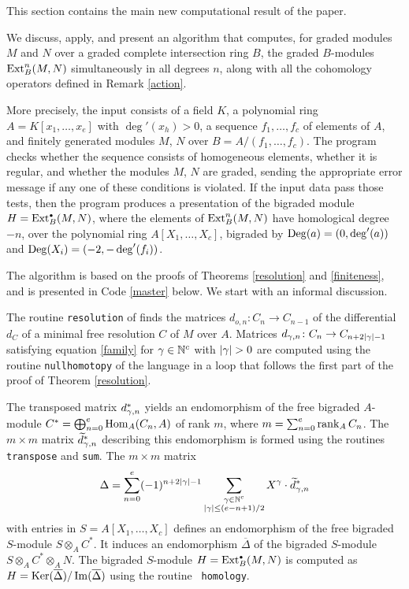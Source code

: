This section contains the main new computational result of the paper.

We discuss, apply, and present an algorithm that computes, for graded
modules $M$ and $N$ over a graded complete intersection ring $B$, the
graded $B$-modules $\operatorname{Ext}^n_B(M,N)$ simultaneously in all degrees $n$,
along with all the cohomology operators defined in Remark
\ref{action}.

More precisely, the input consists of a field $K$, a polynomial ring
$A=K[x_1,\dots,x_e]$ with $\deg'(x_h)>0$, a sequence $f_1,\dots,f_c$ of
elements of $A$, and finitely generated modules $M$, $N$ over
$B=A/(f_1,\dots,f_c)$.  The program checks whether the sequence
consists of homogeneous elements, whether it is regular, and whether
the modules $M$, $N$ are graded, sending the appropriate error message
if any one of these conditions is violated.  If the input data pass
those tests, then the program produces a presentation of the bigraded
module $H=\operatorname{Ext}^{\scriptscriptstyle\bullet}_B(M,N)$, where the elements of $\operatorname{Ext}^n_B(M,N)$ have
homological degree $-n$, over the polynomial ring $A[X_1,\dots,X_c]$,
bigraded by $\operatorname{Deg}(a)=(0,\deg'(a))$ and $\operatorname{Deg}(X_i)=(-2,-\deg'(f_i))$.

The algorithm is based on the proofs of Theorems \ref{resolution} and
\ref{finiteness}, and is presented in Code \ref{master} below.  We
start with an informal discussion.

\begin{Remark}
\label{algorithm}
The routine {\tt resolution} of \Mtwo finds the matrices $d_{o,n}\colon
C_n\to C_{n-1}$ of the differential $d_C$ of a minimal free resolution
$C$ of $M$ over $A$.  Matrices $d_{\gamma,n}\colon C_n\to C_{n+2|\gamma|-1}$
satisfying equation \eqref{family} for $\gamma\in{\mathbb N}^c$ with $|\g|>0$ are
computed using the routine {\tt nullhomotopy} of the \Mtwo language in
a loop that follows the first part of the proof of Theorem
\ref{resolution}.  

The transposed matrix $d^*_{\gamma,n}$ yields an endomorphism of the free
bigraded $A$-module $C^*=\bigoplus_{n=0}^e \operatorname{Hom}_A(C_n,A)$ of rank $m$,
where $m=\sum_{n=0}^e\operatorname{rank}_A C_n$.  The $m\times m$ matrix ${\widetilde
d}^*_{\gamma,n}$ describing this endomorphism is formed using the routines
{\tt transpose} and {\tt sum}.  The $m\times m$ matrix
\[
\Delta = \sum_{n=0}^e(-1)^{n+2|\gamma|-1}
\sum_{\substack{\gamma\in{\mathbb N}^c\\ |\gamma|\le(e-n+1)/2}}
X^{\gamma}\cdot\widetilde d_{\gamma,n}^*
\]
with entries in $S=A[X_1,\dots,X_c]$ defines an endomorphism of the
free bigraded $S$-module $S\otimes_A C^*$.  It induces an endomorphism
$\overline\Delta$ of the bigraded $S$-module $S\otimes_A C^*\otimes_A
N$.  The bigraded $S$-module $H=\operatorname{Ext}^{\scriptscriptstyle\bullet}_B(M,N)$ is computed as
$H=\operatorname{Ker}(\overline\Delta)/ \operatorname{Im}(\overline\Delta)$ using the routine {\tt
homology}.
 \end{Remark}

